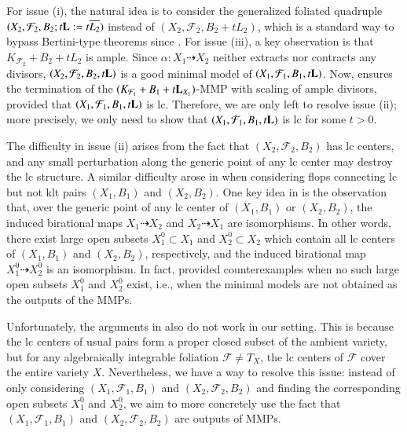 \documentclass[preprint,12pt]{elsarticle}
\newcommand{\Ff}{\mathcal{F}}
\newcommand{\Ll}{{\bf{L}}}
\begin{document}
For issue (i), the natural idea is to consider the generalized foliated quadruple $(X_2,\Ff_2,B_2;t\Ll:=t\overline{L_2})$ instead of $(X_2,\Ff_2,B_2+tL_2)$, which is a standard way to bypass Bertini-type theorems since \cite{LLM23}. For issue (iii), a key observation is that $K_{\Ff_2}+B_2+tL_2$ is ample. Since $\alpha: X_1\dashrightarrow X_2$ neither extracts nor contracts any divisors, $(X_2,\Ff_2,B_2,t\Ll)$ is a good minimal model of $(X_1,\Ff_1,B_1,t\Ll)$. Now, \cite[Theorem 1.11]{LMX24b} ensures the termination of the $(K_{\Ff_1}+B_1+t\Ll_{X_1})$-MMP with scaling of ample divisors, provided that $(X_1,\Ff_1,B_1,t\Ll)$ is lc. Therefore, we are only left to resolve issue (ii); more precisely, we only need to show that $(X_1,\Ff_1,B_1,t\Ll)$ is lc for some $t>0$.


The difficulty in issue (ii) arises from the fact that $(X_2,\Ff_2,B_2)$ has lc centers, and any small perturbation along the generic point of any lc center may destroy the lc structure. A similar difficulty arose in \cite{Has20} when considering flops connecting lc but not klt pairs $(X_1,B_1)$ and $(X_2,B_2)$. One key idea in \cite[Proof of Theorem 1.1]{Has20} is the observation that, over the generic point of any lc center of $(X_1,B_1)$ or $(X_2,B_2)$, the induced birational maps $X_1\dashrightarrow X_2$ and $X_2\dashrightarrow X_1$ are isomorphisms. In other words, there exist large open subsets $X^0_1\subset X_1$ and $X^0_2\subset X_2$ which contain all lc centers of $(X_1,B_1)$ and $(X_2,B_2)$, respectively, and the induced birational map $X^0_1\dashrightarrow X^0_2$ is an isomorphism. In fact, \cite[Section 4]{Has20} provided counterexamples when no such large open subsets $X^0_1$ and $X^0_2$ exist, i.e., when the minimal models are not obtained as the outputs of the MMPs.

Unfortunately, the arguments in \cite[Proof of Theorem 1.1]{Has20} also do not work in our setting. This is because the lc centers of usual pairs form a proper closed subset of the ambient variety, but for any algebraically integrable foliation $\Ff\neq T_X$, the lc centers of $\Ff$ cover the entire variety $X$. Nevertheless, we have a way to resolve this issue: instead of only considering $(X_1,\Ff_1,B_1)$ and $(X_2,\Ff_2,B_2)$ and finding the corresponding open subsets $X^0_1$ and $X^0_2$, we aim to more concretely use the fact that $(X_1,\Ff_1,B_1)$ and $(X_2,\Ff_2,B_2)$ are outputs of MMPs.
\end{document}
